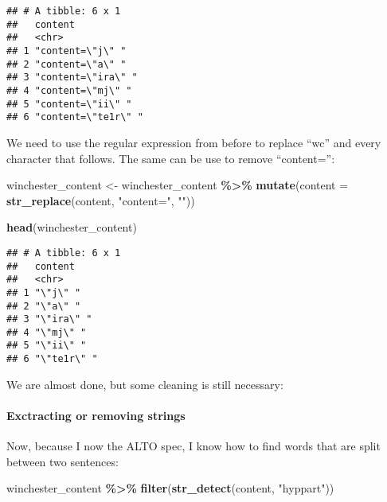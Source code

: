\documentclass[
]{article}
\newenvironment{Shaded}{\begin{snugshade}}{\end{snugshade}}
\newcommand{\DataTypeTok}[1]{\textcolor[rgb]{0.13,0.29,0.53}{#1}}
\newcommand{\KeywordTok}[1]{\textcolor[rgb]{0.13,0.29,0.53}{\textbf{#1}}}
\newcommand{\NormalTok}[1]{#1}
\newcommand{\OperatorTok}[1]{\textcolor[rgb]{0.81,0.36,0.00}{\textbf{#1}}}
\newcommand{\StringTok}[1]{\textcolor[rgb]{0.31,0.60,0.02}{#1}}
\begin{document}
\begin{verbatim}
## # A tibble: 6 x 1
##   content            
##   <chr>              
## 1 "content=\"j\" "   
## 2 "content=\"a\" "   
## 3 "content=\"ira\" " 
## 4 "content=\"mj\" "  
## 5 "content=\"ii\" "  
## 6 "content=\"te1r\" "
\end{verbatim}

We need to use the regular expression from before to replace ``wc'' and every character that follows.
The same can be use to remove ``content='':

\begin{Shaded}
\begin{Highlighting}[]
\NormalTok{winchester\_content \textless{}{-}}\StringTok{ }\NormalTok{winchester\_content }\OperatorTok{\%\textgreater{}\%}\StringTok{ }
\StringTok{  }\KeywordTok{mutate}\NormalTok{(}\DataTypeTok{content =} \KeywordTok{str\_replace}\NormalTok{(content, }\StringTok{"content="}\NormalTok{, }\StringTok{""}\NormalTok{))}

\KeywordTok{head}\NormalTok{(winchester\_content)}
\end{Highlighting}
\end{Shaded}

\begin{verbatim}
## # A tibble: 6 x 1
##   content    
##   <chr>      
## 1 "\"j\" "   
## 2 "\"a\" "   
## 3 "\"ira\" " 
## 4 "\"mj\" "  
## 5 "\"ii\" "  
## 6 "\"te1r\" "
\end{verbatim}

We are almost done, but some cleaning is still necessary:

\hypertarget{exctracting-or-removing-strings}{%
\paragraph{Exctracting or removing strings}\label{exctracting-or-removing-strings}}

Now, because I now the ALTO spec, I know how to find words that are split between two sentences:

\begin{Shaded}
\begin{Highlighting}[]
\NormalTok{winchester\_content }\OperatorTok{\%\textgreater{}\%}\StringTok{ }
\StringTok{  }\KeywordTok{filter}\NormalTok{(}\KeywordTok{str\_detect}\NormalTok{(content, }\StringTok{"hyppart"}\NormalTok{))}
\end{Highlighting}
\end{Shaded}
\end{document}
